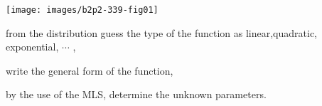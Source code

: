 \documentclass[11pt]{amsbook}
\begin{document}
\begin{hEnumerateArabic}
\begin{multicols}{2}
		\texttt{[image: images/b2p2-339-fig01]}
	\end{multicols}
	
	\begin{hEnumerateRoman}
	
		\item
		from the distribution guess the type of the function as linear,quadratic, exponential, $\cdots$ ,
		
		\item
		write the general form of the function,
		
		\item
		by the use of the MLS, determine the unknown parameters.
	\end{hEnumerateRoman}
\end{hEnumerateArabic}


\end{document}
